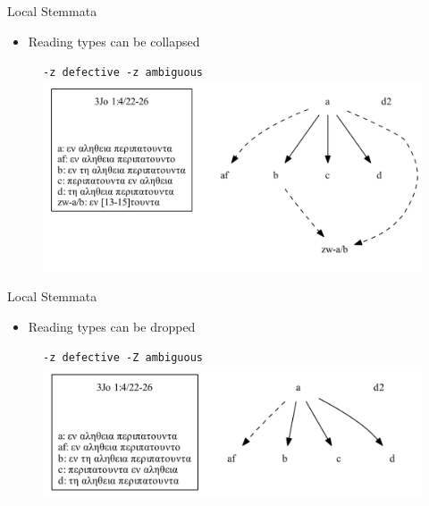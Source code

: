 \documentclass[10pt]{beamer}
\begin{document}
	\begin{frame}{Local Stemmata}
		\begin{itemize}
			\item Reading types can be collapsed
		\end{itemize}
		\begin{figure}
			\centering
			\texttt{-z defective -z ambiguous}
			\includegraphics[width=\textwidth]{../graphics/B25K1V4U22-26-local-stemma-ignore-defective-ignore-ambiguous.pdf}
		\end{figure}
	\end{frame}
	\begin{frame}{Local Stemmata}
		\begin{itemize}
			\item Reading types can be dropped
		\end{itemize}
		\begin{figure}
			\centering
			\texttt{-z defective -Z ambiguous}
			\includegraphics[width=\textwidth]{../graphics/B25K1V4U22-26-local-stemma-ignore-defective-drop-ambiguous.pdf}
		\end{figure}
	\end{frame}
\end{document}

